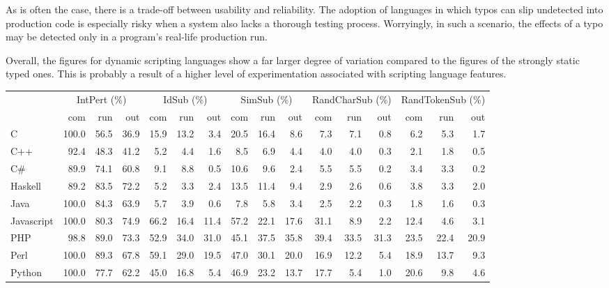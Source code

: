 \documentclass[10pt]{sigplanconf}
\begin{document}
As is often the case,
there is a trade-off between usability and reliability.
The adoption of languages in which typos can slip undetected
into production code is especially risky when a system also lacks
a thorough testing process.
Worryingly, in such a scenario, the effects of a typo may be
detected only in a program's real-life production run.

Overall, the figures for dynamic scripting languages show a far larger
degree of variation compared to the figures of the strongly static typed
ones.
This is probably a result of a higher level of experimentation
associated with scripting language features.

\begin{table}
\begin{center}
\begin{tabular}{ l r r r|r r r|r r r|r r r|r r r}
& \multicolumn{3}{c}{IntPert (\%)} & \multicolumn{3}{c}{IdSub (\%)} & \multicolumn{3}{c}{SimSub (\%)} & \multicolumn{3}{c}{RandCharSub (\%)} & \multicolumn{3}{c}{RandTokenSub (\%)}\\ 
	       & com  & run  & out  & com  & run  & out  & com  & run  & out  & com & run   & out  & com  & run  & out\\
\hline													
C & 100.0 & 56.5 & 36.9  & 15.9 & 13.2 & 3.4  & 20.5 & 16.4 & 8.6  & 7.3 & 7.1 & 0.8  & 6.2 & 5.3 & 1.7 \\
C++ & 92.4 & 48.3 & 41.2  & 5.2 & 4.4 & 1.6  & 8.5 & 6.9 & 4.4  & 4.0 & 4.0 & 0.3  & 2.1 & 1.8 & 0.5 \\
C\# & 89.9 & 74.1 & 60.8  & 9.1 & 8.8 & 0.5  & 10.6 & 9.6 & 2.4  & 5.5 & 5.5 & 0.2  & 3.4 & 3.3 & 0.2 \\
Haskell & 89.2 & 83.5 & 72.2  & 5.2 & 3.3 & 2.4  & 13.5 & 11.4 & 9.4  & 2.9 & 2.6 & 0.6  & 3.8 & 3.3 & 2.0 \\
Java & 100.0 & 84.3 & 63.9  & 5.7 & 3.9 & 0.6  & 7.8 & 5.8 & 3.4  & 2.5 & 2.2 & 0.3  & 1.8 & 1.6 & 0.3 \\
Javascript & 100.0 & 80.3 & 74.9  & 66.2 & 16.4 & 11.4  & 57.2 & 22.1 & 17.6  & 31.1 & 8.9 & 2.2  & 12.4 & 4.6 & 3.1 \\
PHP & 98.8 & 89.0 & 73.3  & 52.9 & 34.0 & 31.0  & 45.1 & 37.5 & 35.8  & 39.4 & 33.5 & 31.3  & 23.5 & 22.4 & 20.9 \\
Perl & 100.0 & 89.3 & 67.8  & 59.1 & 29.0 & 19.5  & 47.0 & 30.1 & 20.0  & 16.9 & 12.2 & 5.4  & 18.9 & 13.7 & 9.3 \\
Python & 100.0 & 77.7 & 62.2  & 45.0 & 16.8 & 5.4  & 46.9 & 23.2 & 13.7  & 17.7 & 5.4 & 1.0  & 20.6 & 9.8 & 4.6 \\

\end{tabular}
\end{center}
\end{table}
\end{document}
